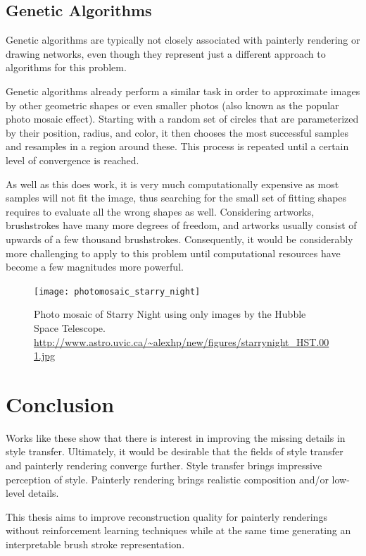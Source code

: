 \subsection{Genetic Algorithms}
Genetic algorithms are typically not closely associated with painterly rendering or drawing networks, even though they represent just a different approach to algorithms for this problem.

Genetic algorithms already perform a similar task in order to approximate images by other geometric shapes or even smaller photos (also known as the popular photo mosaic effect).
Starting with a random set of circles that are parameterized by their position, radius, and color, it then chooses the most successful samples and resamples in a region around these.
This process is repeated until a certain level of convergence is reached.


As well as this does work, it is very much computationally expensive as most samples will not fit the image, thus searching for the small set of fitting shapes requires to evaluate all the wrong shapes as well.
Considering artworks, brushstrokes have many more degrees of freedom, and artworks usually consist of upwards of a few thousand brushstrokes.
Consequently, it would be considerably more challenging to apply to this problem until computational resources have become a few magnitudes more powerful.

\begin{figure}
    \texttt{[image: photomosaic\_starry\_night]}
    \caption{Photo mosaic of Starry Night using only images by the Hubble Space Telescope. \url{http://www.astro.uvic.ca/~alexhp/new/figures/starrynight_HST.001.jpg}}
\end{figure}



\section{Conclusion}
Works like these show that there is interest in improving the missing details in style transfer.
Ultimately, it would be desirable that the fields of style transfer and painterly rendering converge further.
Style transfer brings impressive perception of style.
Painterly rendering brings realistic composition and/or low-level details.

This thesis aims to improve reconstruction quality for painterly renderings without reinforcement learning techniques while at the same time generating an interpretable brush stroke representation.
